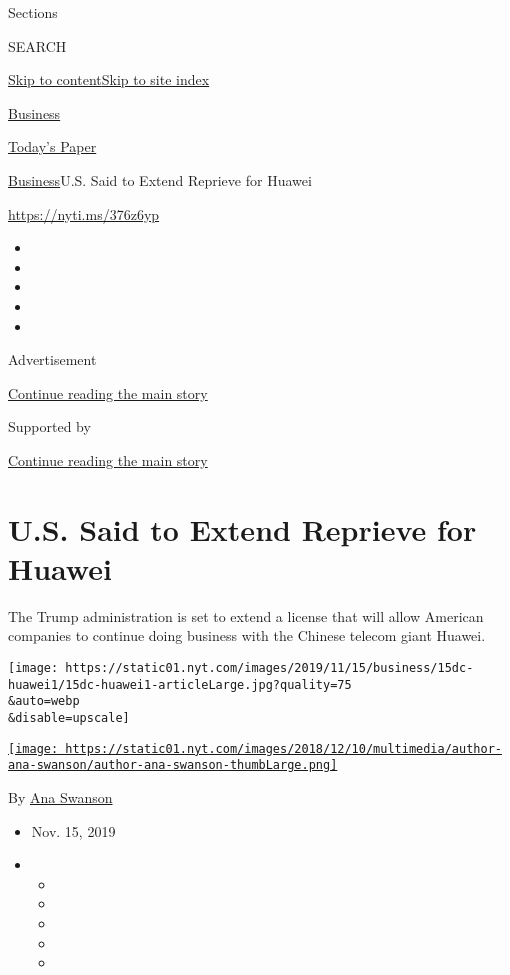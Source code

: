 Sections

SEARCH

\protect\hyperlink{site-content}{Skip to
content}\protect\hyperlink{site-index}{Skip to site index}

\href{https://www.nytimes.com/section/business}{Business}

\href{https://myaccount.nytimes.com/auth/login?response_type=cookie\&client_id=vi}{}

\href{https://www.nytimes.com/section/todayspaper}{Today's Paper}

\href{/section/business}{Business}\textbar{}U.S. Said to Extend Reprieve
for Huawei

\url{https://nyti.ms/376z6yp}

\begin{itemize}
\item
\item
\item
\item
\item
\end{itemize}

Advertisement

\protect\hyperlink{after-top}{Continue reading the main story}

Supported by

\protect\hyperlink{after-sponsor}{Continue reading the main story}

\hypertarget{us-said-to-extend-reprieve-for-huawei}{%
\section{U.S. Said to Extend Reprieve for
Huawei}\label{us-said-to-extend-reprieve-for-huawei}}

The Trump administration is set to extend a license that will allow
American companies to continue doing business with the Chinese telecom
giant Huawei.

\texttt{[image: https://static01.nyt.com/images/2019/11/15/business/15dc-huawei1/15dc-huawei1-articleLarge.jpg?quality=75\\\&auto=webp\\\&disable=upscale]}

\href{https://www.nytimes.com/by/ana-swanson}{\texttt{[image: https://static01.nyt.com/images/2018/12/10/multimedia/author-ana-swanson/author-ana-swanson-thumbLarge.png]}}

By \href{https://www.nytimes.com/by/ana-swanson}{Ana Swanson}

\begin{itemize}
\item
  Nov. 15, 2019
\item
  \begin{itemize}
  \item
  \item
  \item
  \item
  \item
  \end{itemize}
\end{itemize}

